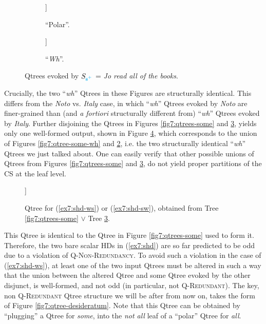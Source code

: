 \begin{figure}[H]
	\centering
	\begin{subfigure}[b]{.45\linewidth}
		\centering
		\begin{forest}
			[CS[$\neg\forall$][\fbox{$\forall$}]]
		\end{forest}
		\caption[]{``Polar''.}\label{fig7:qtree-all-polar}
	\end{subfigure}
	\hfill
	\begin{subfigure}[b]{.45\linewidth}
		\centering
		\begin{forest}
			[CS[$\neg\exists$][$\exists\wedge\neg\forall$][\fbox{$\forall$}]]
		\end{forest}
		\caption[]{``\textit{Wh}''.}\label{fig7:qtree-all-wh}
	\end{subfigure}
	\caption[]{Qtrees evoked by $S_{\textbf{\textcolor{cyan}{s$^+$}}}$ = \textit{Jo read all of the books}. }\label{fig7:qtrees-all}
\end{figure}

Crucially, the two ``\textit{wh}'' Qtrees in these Figures are structurally identical. This differs from the \textit{Noto} vs. \textit{Italy} case, in which ``\textit{wh}'' Qtrees evoked by \textit{Noto} are finer-grained than (and \textit{a fortiori} structurally different from) ``\textit{wh}'' Qtrees evoked by \textit{Italy}. Further disjoining the Qtrees in Figures \ref{fig7:qtrees-some} and \ref{fig7:qtrees-all}, yields only one well-formed output, shown in Figure \ref{fig7:qtree-shd}, which corresponds to the union of Figures \ref{fig7:qtree-some-wh} and \ref{fig7:qtree-all-wh}, i.e. the two structurally identical ``\textit{wh}'' Qtrees we just talked about. One can  easily verify that other possible unions of Qtrees from Figures \ref{fig7:qtrees-some} and \ref{fig7:qtrees-all}, do not yield proper partitions of the CS at the leaf level.

\begin{figure}[H]
	\centering
	\begin{forest}
		[CS[$\neg\exists$][\fbox{$\exists\wedge\neg\forall$}][\fbox{$\forall$}]]
	\end{forest}
	\caption[]{Qtree for (\ref{ex7:shd-ws}) or (\ref{ex7:shd-sw}), obtained from Tree \ref{fig7:qtrees-some} $\vee$ Tree \ref{fig7:qtrees-all}.}\label{fig7:qtree-shd}
\end{figure}

This Qtree is identical to the Qtree in Figure \ref{fig7:qtrees-some} used to form it. Therefore, the two bare scalar HDs in (\ref{ex7:shd}) are so far predicted to be odd due to a violation of \textsc{Q-Non-Redundancy}. To avoid such a violation in the case of (\ref{ex7:shd-ws}), at least one of the two input Qtrees must be altered in such a way that the union between the altered Qtree and some Qtree evoked by the other disjunct, is well-formed, and not odd (in particular, not \textsc{Q-Redundant}). The key, non \textsc{Q-Redundant} Qtree structure we will be after from now on, takes the form of Figure \ref{fig7:qtree-desideratum}. Note that this Qtree can be obtained by ``plugging'' a Qtree for \textit{some}, into the \textit{not all} leaf of a ``polar'' Qtree for \textit{all}.

